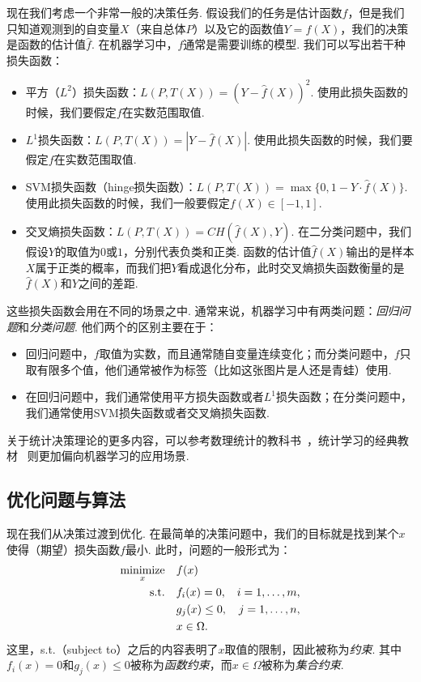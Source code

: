 现在我们考虑一个非常一般的决策任务. 假设我们的任务是估计函数$f$，但是我们只知道观测到的自变量$X$（来自总体$P$）以及它的函数值$Y=f(X)$，我们的决策是函数的估计值$\hat f$. 在机器学习中，$f$通常是需要训练的模型. 我们可以写出若干种损失函数：
\begin{itemize}
    \item 平方（$L^2$）损失函数：$L(P,T(X))=(Y-\hat f(X))^2$. 使用此损失函数的时候，我们要假定$f$在实数范围取值. 
    \item $L^1$损失函数：$L(P,T(X))=|Y-\hat f(X)|$. 使用此损失函数的时候，我们要假定$f$在实数范围取值. 
    \item SVM损失函数（hinge损失函数）：$L(P,T(X))=\max\{0,1-Y\cdot\hat f(X)\}$. 使用此损失函数的时候，我们一般要假定$f(X)\in[-1,1]$. 
    \item 交叉熵损失函数：$L(P,T(X))=CH(\hat f(X),Y)$. 在二分类问题中，我们假设$Y$的取值为$0$或$1$，分别代表负类和正类. 函数的估计值$\hat f (X)$输出的是样本$X$属于正类的概率，而我们把$Y$看成退化分布，此时交叉熵损失函数衡量的是$\hat f(X)$和$Y$之间的差距.
\end{itemize}

这些损失函数会用在不同的场景之中. 通常来说，机器学习中有两类问题：\textit{回归问题}和\textit{分类问题}. 他们两个的区别主要在于：
\begin{itemize}
    \item 回归问题中，$f$取值为实数，而且通常随自变量连续变化；而分类问题中，$f$只取有限多个值，他们通常被作为标签（比如这张图片是人还是青蛙）使用.
    \item 在回归问题中，我们通常使用平方损失函数或者$L^1$损失函数；在分类问题中，我们通常使用SVM损失函数或者交叉熵损失函数.
\end{itemize}

\begin{remark}
    关于统计决策理论的更多内容，可以参考数理统计的教科书~\cite{shaoMathematicalStatistics2003}，统计学习的经典教材~\cite{hastieElementsStatisticalLearning2009} 则更加偏向机器学习的应用场景. 
\end{remark}

\subsection{优化问题与算法}
现在我们从决策过渡到优化. 在最简单的决策问题中，我们的目标就是找到某个$x$使得（期望）损失函数$f$最小. 此时，问题的一般形式为：
\begin{equation}
\begin{alignedat}{2}
\operatorname*{minimize}_{x}&\quad f(x)\\
\text{s.t.}&\quad f_i(x)=0,&\quad i=1,\dots,m,\\
&\quad g_j(x)\leq 0,&\quad j=1,\dots,n,\\
&\quad x\in\Omega.
\end{alignedat}
\label{eq:opt-general}
\end{equation}
这里，s.t.（subject to）之后的内容表明了$x$取值的限制，因此被称为\textit{约束}. 其中$f_i(x)=0$和$g_j(x)\leq 0$被称为\textit{函数约束}，而$x\in\Omega$被称为\textit{集合约束}.

